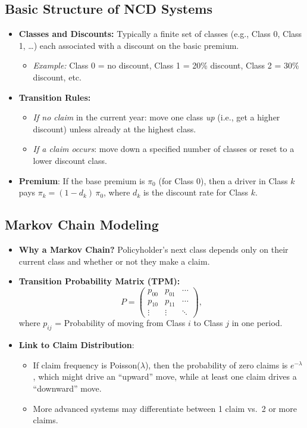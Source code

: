 \documentclass[13pt,a4paper]{article}
\begin{document}
\subsection{Basic Structure of NCD Systems}
\begin{itemize}
  \item \textbf{Classes and Discounts:} Typically a finite set of classes (e.g., Class 0, Class 1, \dots) each associated with a discount on the basic premium.
  \begin{itemize}
    \item \emph{Example:} Class 0 = no discount, Class 1 = 20\% discount, Class 2 = 30\% discount, etc.
  \end{itemize}
  \item \textbf{Transition Rules:}
  \begin{itemize}
    \item \emph{If no claim} in the current year: move one class \emph{up} (i.e., get a higher discount) unless already at the highest class.
    \item \emph{If a claim occurs}: move down a specified number of classes or reset to a lower discount class.
  \end{itemize}
  \item \textbf{Premium}: If the base premium is \(\pi_0\) (for Class 0), then a driver in Class \(k\) pays \(\pi_k = (1 - d_k)\,\pi_0\), where \(d_k\) is the discount rate for Class \(k\).
\end{itemize}

\subsection{Markov Chain Modeling}
\begin{itemize}
  \item \textbf{Why a Markov Chain?} Policyholder’s next class depends only on their current class and whether or not they make a claim.
  \item \textbf{Transition Probability Matrix (TPM):}
  \[
    P = \begin{pmatrix}
      p_{00} & p_{01} & \cdots \\
      p_{10} & p_{11} & \cdots \\
      \vdots & \vdots & \ddots
    \end{pmatrix},
  \]
  where \(p_{ij}\) = Probability of moving from Class \(i\) to Class \(j\) in one period.
  \item \textbf{Link to Claim Distribution}: 
    \begin{itemize}
      \item If claim frequency is Poisson(\(\lambda\)), then the probability of zero claims is \(e^{-\lambda}\), which might drive an “upward” move, while at least one claim drives a “downward” move.
      \item More advanced systems may differentiate between 1 claim vs.\ 2 or more claims.
    \end{itemize}
\end{itemize}
\end{document}
